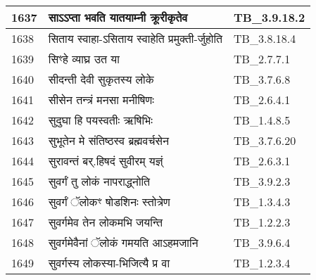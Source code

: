 \documentclass[17pt]{extarticle}
\begin{document}
\begin{longtable}{||p{0.4in}||p{4.9in}||p{0.9in}||}
    \hline
        
    1637 & साऽऽप्ता भवति यातयाम्नी क्रूरीकृतेव & TB\_3.9.18.2       \\
    
    \hline
        
    1638 & सिताय स्वाहा{-}ऽसिताय स्वाहेति प्रमुक्ती{-}र्जुहोति & TB\_3.8.18.4       \\
    
    \hline
        
    1639 & सिꣳहे व्याघ्र उत या & TB\_2.7.7.1       \\
    
    \hline
        
    1640 & सीदन्ती देवी सुकृतस्य लोके & TB\_3.7.6.8       \\
    
    \hline
        
    1641 & सीसेन तन्त्रं मनसा मनीषिणः & TB\_2.6.4.1       \\
    
    \hline
        
    1642 & सुदुघा हि पयस्वतीः ऋषिभिः & TB\_1.4.8.5       \\
    
    \hline
        
    1643 & सुभूतेन मे संतिष्ठस्व ब्रह्मवर्चसेन & TB\_3.7.6.20       \\
    
    \hline
        
    1644 & सुरावन्तं बर्.हिषदं सुवीरम् यज्ञ्ं & TB\_2.6.3.1       \\
    
    \hline
        
    1645 & सुवर्गं तु लोकं नापराद्ध्नोति & TB\_3.9.2.3       \\
    
    \hline
        
    1646 & सुवर्गं ॅलोकꣳ षोडशिनः स्तोत्रेण & TB\_1.3.4.3       \\
    
    \hline
        
    1647 & सुवर्गमेव तेन लोकमभि जयन्ति & TB\_1.2.2.3       \\
    
    \hline
        
    1648 & सुवर्गमेवैनां ॅलोकं गमयति आऽहमजानि & TB\_3.9.6.4       \\
    
    \hline
        
    1649 & सुवर्गस्य लोकस्या{-}भिजित्यै प्र वा & TB\_1.2.3.4       \\
    

\end{longtable}
\end{document}
